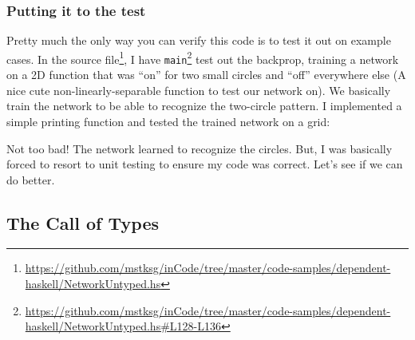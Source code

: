 \documentclass[]{article}
\newenvironment{Shaded}{}{}
\newcommand{\CommentTok}[1]{\textcolor[rgb]{0.38,0.63,0.69}{\textit{#1}}}
\newcommand{\ExtensionTok}[1]{#1}
\newcommand{\NormalTok}[1]{#1}
\renewcommand{\href}[2]{#2\footnote{\url{#1}}}
\begin{document}
\hypertarget{putting-it-to-the-test}{%
\subsubsection{Putting it to the test}\label{putting-it-to-the-test}}

Pretty much the only way you can verify this code is to test it out on example
cases. In the
\href{https://github.com/mstksg/inCode/tree/master/code-samples/dependent-haskell/NetworkUntyped.hs}{source
file}, I have
\href{https://github.com/mstksg/inCode/tree/master/code-samples/dependent-haskell/NetworkUntyped.hs\#L128-L136}{\texttt{main}}
test out the backprop, training a network on a 2D function that was ``on'' for
two small circles and ``off'' everywhere else (A nice cute
non-linearly-separable function to test our network on). We basically train the
network to be able to recognize the two-circle pattern. I implemented a simple
printing function and tested the trained network on a grid:

\begin{Shaded}
\end{Shaded}

Not too bad! The network learned to recognize the circles. But, I was basically
forced to resort to unit testing to ensure my code was correct. Let's see if we
can do better.

\hypertarget{the-call-of-types}{%
\subsection{The Call of Types}\label{the-call-of-types}}
\end{document}
